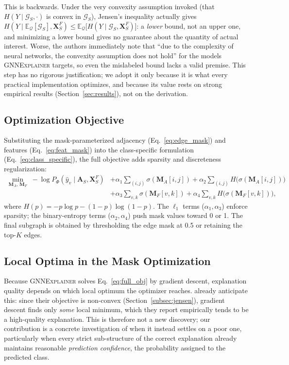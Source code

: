 \documentclass{article}
\newcommand{\GNNEx}{\textsc{GNNExplainer}\xspace}
\newcommand{\calG}{\mathcal{G}}
\newcommand{\bfA}{\mathbf{A}}
\newcommand{\bfX}{\mathbf{X}}
\newcommand{\bfM}{\mathbf{M}}
\newcommand{\sigmoid}{\sigma}
\theoremstyle{definition}
\begin{document}
This is backwards. Under the very convexity assumption invoked (that
$H(Y \mid \calG_S, \cdot)$ is convex in $\calG_S$), Jensen's inequality actually
gives $H(Y \mid \mathbb{E}_{\mathcal{Q}}[\calG_S], \bfX_S^F) \leq
\mathbb{E}_{\mathcal{Q}}\bigl[H(Y \mid \calG_S, \bfX_S^F)\bigr]$: a \emph{lower}
bound, not an upper one, and minimizing a lower bound gives no guarantee about
the quantity of actual interest. Worse, the authors immediately note that
``due to the complexity of neural networks, the convexity assumption does not
hold'' for the models \GNNEx targets, so even the mislabeled bound lacks a
valid premise. This step has no rigorous justification; we adopt it only
because it is what every practical implementation optimizes, and because
its value rests on strong empirical results (Section~\ref{sec:results}),
not on the derivation.

\subsection{Optimization Objective}

Substituting the mask-parameterized adjacency (Eq.~\ref{eq:edge_mask}) and
features (Eq.~\ref{eq:feat_mask}) into the class-specific formulation
(Eq.~\ref{eq:class_specific}), the full objective adds sparsity and
discreteness regularization:
\begin{align}
  \min_{\bfM_A,\, \bfM_F}\;
  -\log P_\Phi(\hat{y}_v \mid \bfA_S, \bfX_S^F)
  &+ \alpha_1 \!\sum_{(i,j)}\! \sigmoid(\bfM_A[i,j])
   + \alpha_2 \!\sum_{(i,j)}\! H\!\bigl(\sigmoid(\bfM_A[i,j])\bigr)
  \nonumber\\
  &+ \alpha_3 \sum_{v,k} \sigmoid(\bfM_F[v,k])
   + \alpha_4 \sum_{v,k} H\!\bigl(\sigmoid(\bfM_F[v,k])\bigr),
  \label{eq:full_obj}
\end{align}
where $H(p) = -p\log p - (1-p)\log(1-p)$. The $\ell_1$ terms ($\alpha_1,
\alpha_3$) enforce sparsity; the binary-entropy terms ($\alpha_2, \alpha_4$)
push mask values toward 0 or 1. The final subgraph is obtained by thresholding
the edge mask at 0.5 or retaining the top-$K$ edges.

\subsection{Local Optima in the Mask Optimization}
\label{subsec:localopt}

Because \GNNEx solves Eq.~\eqref{eq:full_obj} by gradient descent, explanation
quality depends on which local optimum the optimizer reaches.
\citet{ying2019gnnexplainer} already anticipate this: since their objective
is non-convex (Section~\ref{subsec:jensen}), gradient descent finds only
\emph{some} local minimum, which they report empirically tends to be a
high-quality explanation. This is therefore not a new discovery; our
contribution is a concrete investigation of when it instead settles on a
poor one, particularly when every strict sub-structure of the correct
explanation already maintains reasonable \emph{prediction confidence}, the
probability assigned to the predicted class.
\end{document}
